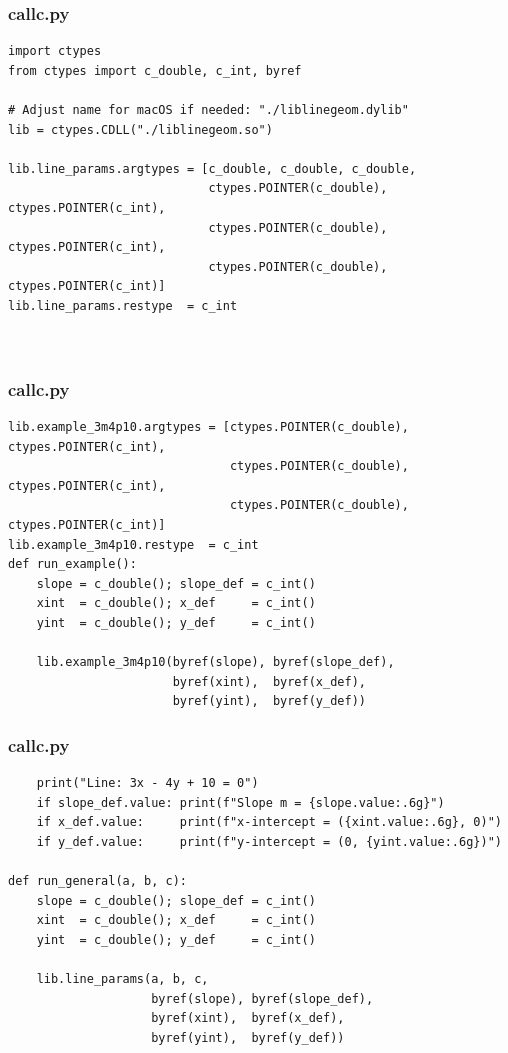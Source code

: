 \documentclass{beamer}
\begin{document}
\begin{frame}[fragile]
\frametitle{callc.py}
    \begin{lstlisting}    
import ctypes
from ctypes import c_double, c_int, byref

# Adjust name for macOS if needed: "./liblinegeom.dylib"
lib = ctypes.CDLL("./liblinegeom.so")

lib.line_params.argtypes = [c_double, c_double, c_double,
                            ctypes.POINTER(c_double), ctypes.POINTER(c_int),
                            ctypes.POINTER(c_double), ctypes.POINTER(c_int),
                            ctypes.POINTER(c_double), ctypes.POINTER(c_int)]
lib.line_params.restype  = c_int



    \end{lstlisting}
\end{frame}
\begin{frame}[fragile]
\frametitle{callc.py}
\begin{lstlisting}
lib.example_3m4p10.argtypes = [ctypes.POINTER(c_double), ctypes.POINTER(c_int),
                               ctypes.POINTER(c_double), ctypes.POINTER(c_int),
                               ctypes.POINTER(c_double), ctypes.POINTER(c_int)]
lib.example_3m4p10.restype  = c_int
def run_example():
    slope = c_double(); slope_def = c_int()
    xint  = c_double(); x_def     = c_int()
    yint  = c_double(); y_def     = c_int()

    lib.example_3m4p10(byref(slope), byref(slope_def),
                       byref(xint),  byref(x_def),
                       byref(yint),  byref(y_def))
\end{lstlisting} 
\end{frame}
\begin{frame}[fragile]
\frametitle{callc.py}
\begin{lstlisting}
    print("Line: 3x - 4y + 10 = 0")
    if slope_def.value: print(f"Slope m = {slope.value:.6g}")
    if x_def.value:     print(f"x-intercept = ({xint.value:.6g}, 0)")
    if y_def.value:     print(f"y-intercept = (0, {yint.value:.6g})")

def run_general(a, b, c):
    slope = c_double(); slope_def = c_int()
    xint  = c_double(); x_def     = c_int()
    yint  = c_double(); y_def     = c_int()

    lib.line_params(a, b, c,
                    byref(slope), byref(slope_def),
                    byref(xint),  byref(x_def),
                    byref(yint),  byref(y_def))

\end{lstlisting}
\end{frame}
\end{document}
